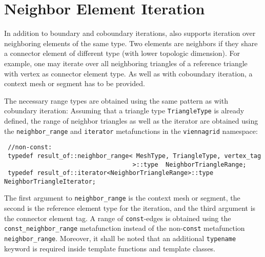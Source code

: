 \section{Neighbor Element Iteration}
In addition to boundary and coboundary iterations, {\ViennaGridversion} also supports iteration over neighboring elements of the same type.
Two elements are neighbors if they share a connector element of different type (with lower topologic dimension).
For example, one may iterate over all neighboring triangles of a reference triangle with vertex as connector element type.
As well as with coboundary iteration, a context mesh or segment has to be provided.


The necessary range types are obtained using the same pattern as with cobundary iteration:
Assuming that a triangle type \lstinline|TriangleType| is already defined, the range of neighbor triangles as well as the iterator are obtained
using the \lstinline|neighbor_range| and \lstinline|iterator| metafunctions in the \lstinline|viennagrid| namespace:
\begin{lstlisting}
 //non-const:
 typedef result_of::neighbor_range< MeshType, TriangleType, vertex_tag
                                   >::type  NeighborTriangleRange;
 typedef result_of::iterator<NeighborTriangleRange>::type   NeighborTriangleIterator;
\end{lstlisting}
The first argument to \lstinline|neighbor_range| is the context mesh or segment, the second is the reference element type for the iteration, and the third argument is the connector element tag.
A range of \lstinline|const|-edges is obtained using the \lstinline|const_neighbor_range| metafunction instead of the non-\lstinline|const| metafunction \lstinline|neighbor_range|.
Moreover, it shall be noted that an additional \lstinline|typename| keyword is required inside template functions and template classes.

